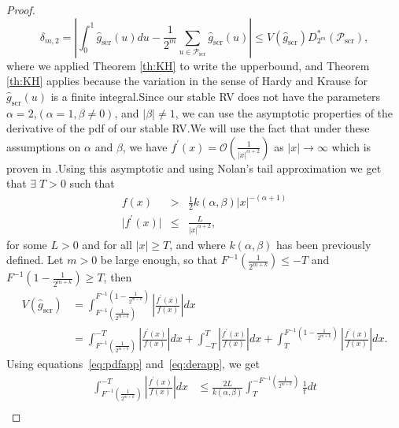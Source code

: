 \documentclass{article}
\theoremstyle{definition}
\begin{document}
\begin{proof}
\begin{equation}
\label{using upper bound}
\delta_{m,2}=\left\lvert \int_0^1\hat{g}_{\text{scr}}(u)du-\frac{1}{2^m}\sum_{u\in\mathcal{P}_{\text{scr}}}\hat{g}_{\text{scr}}(u)\right\rvert
\leq V(\hat{g}_{\text{scr}})D^{\ast}_{2^m}(\mathcal{P}_{\text{scr}}),
\end{equation}
where we applied Theorem \ref{th:KH} to write the upperbound, and Theorem \ref{th:KH} applies because the variation in the sense of Hardy and Krause for $\hat{g}_{\text{scr}}(u)$ is a finite integral.Since our stable RV does not have the parameters $\alpha=2$,$(\alpha=1,\beta\neq0)$, and  $\lvert\beta\rvert\neq1$, we can use the asymptotic properties of the derivative of the pdf of our stable RV.We will use the fact that under these assumptions on $\alpha$ and $\beta$, we have \(f^{\prime}(x)=\mathcal{O}\left(\frac{1}{\lvert x\rvert ^{\alpha+2}}\right)\) as $\lvert x\rvert\to\infty$ which is proven in \cite{alma991006837049709436}.Using this asymptotic and using Nolan's tail approximation we get that $\exists \;T>0$ such that  
\begin{eqnarray}
f(x) &>& \frac{1}{2}k(\alpha,\beta) |x|^{-(\alpha+1)} \label{eq:pdfapp}\\
\lvert f^{\prime}(x)\rvert &\leq& \frac{L}{\lvert x \rvert ^{\alpha +2}}, \label{eq:derapp}
\end{eqnarray}
for some $L > 0$ and for all $|x| \geq T$, and where $k(\alpha,\beta)$ has been previously defined. 
Let $m > 0$ be large enough, so that $F^{-1}\left(\frac{1}{2^{m+k}}\right) \leq  -T$ and $F^{-1}\left(1-\frac{1}{2^{m+k}}\right) \geq T$, then 
\begin{align*} 
V(\hat{g}_{\text{scr}})&= \int_{F^{-1}\left(\frac{1}{2^{m+k}}\right)}^{F^{-1}\left(1-\frac{1}{2^{m+k}}\right)}\left\lvert \frac{f^{\prime}(x)}{f(x)}\right\rvert dx \\
&=\int_{{F^{-1}\left(\frac{1}{2^{m+k}}\right)}}^{-T}\left\lvert \frac{f^{\prime}(x)}{f(x)} \right\rvert dx+ \int_{-T}^{T} \left\lvert \frac{f^{\prime}(x)}{f(x)} \right\rvert dx + \int_{T}^{F^{-1}\left(1-\frac{1}{2^{m+k}}\right)}\left\lvert \frac{f^{\prime}(x)}{f(x)} \right\rvert dx.
\end{align*}
Using equations~\eqref{eq:pdfapp} and~\eqref{eq:derapp}, we get 
\begin{align*}
\int_{{F^{-1}\left(\frac{1}{2^{m+k}}\right)}}^{-T}\left\lvert \frac{f^{\prime}(x)}{f(x)} \right\rvert dx &\leq
\frac{2L}{k(\alpha,\beta) }\int_{T}^{-{F^{-1}(\frac{1}{2^{m+k}})}}\frac{1}{t} dt\\

\end{align*}
\end{proof}
\end{document}
